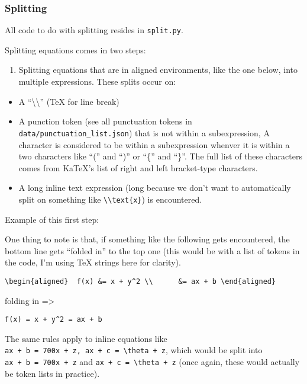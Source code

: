 \documentclass[]{article}
\providecommand{\tightlist}{%
  \setlength{\itemsep}{0pt}\setlength{\parskip}{0pt}}
\begin{document}
\hypertarget{splitting}{%
\subsubsection{Splitting}\label{splitting}}

All code to do with splitting resides in \texttt{split.py}.

Splitting equations comes in two steps:

\begin{enumerate}
\def\labelenumi{\arabic{enumi}.}
\tightlist
\item
  Splitting equations that are in aligned environments, like the one
  below, into multiple expressions. These splits occur on:
\end{enumerate}

\begin{itemize}
\tightlist
\item
  A ``\textbackslash{}\textbackslash{}'' (TeX for line break)
\item
  A punction token (see all punctuation tokens in
  \texttt{data/punctuation\_list.json}) that is not within a
  subexpression, A character is considered to be within a subexpression
  whenver it is within a two characters like ``('' and ``)'' or ``\{''
  and ``\}''. The full list of these characters comes from KaTeX's list
  of right and left bracket-type characters.
\item
  A long inline text expression (long because we don't want to
  automatically split on something like
  \texttt{\textbackslash{}\textbackslash{}text\{x\}}) is encountered.
\end{itemize}

Example of this first step:

One thing to note is that, if something like the following gets
encountered, the bottom line gets ``folded in'' to the top one (this
would be with a list of tokens in the code, I'm using TeX strings here
for clarity).

\texttt{\textbackslash{}begin\{aligned\}\ \ f(x)\ \&=\ x\ +\ y\^{}2\ \textbackslash{}\textbackslash{}\ \ \ \ \ \ \&=\ ax\ +\ b\ \textbackslash{}end\{aligned\}}

folding in =\textgreater{}

\texttt{f(x)\ =\ x\ +\ y\^{}2\ =\ ax\ +\ b}

The same rules apply to inline equations like
\texttt{ax\ +\ b\ =\ 700x\ +\ z,\ ax\ +\ c\ =\ \textbackslash{}theta\ +\ z},
which would be split into \texttt{ax\ +\ b\ =\ 700x\ +\ z} and
\texttt{ax\ +\ c\ =\ \textbackslash{}theta\ +\ z} (once again, these
would actually be token lists in practice).
\end{document}
